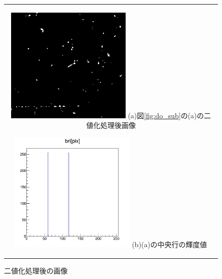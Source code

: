 \documentclass[12pt,a4paper]{jarticle}
\begin{document}
\begin{figure}[htbp]
    \begin{center}
      \begin{tabular}{c}
        \begin{minipage}{0.5\hsize}
          \begin{center}
            \includegraphics[clip, width=60mm]{thre.png}
            \hspace{1.6cm} (a)図\ref{fig:do_sub}の(a)の二値化処理後画像
          \end{center}
        \end{minipage}

        \begin{minipage}{0.5\hsize}
          \begin{center}
            \includegraphics[clip, width=60mm]{thre_hist.png}
            \hspace{1.6cm} (b)(a)の中央行の輝度値
          \end{center}
        \end{minipage}
    
      \end{tabular}
      \caption{二値化処理後の画像\label{fig:do_thre}}
    \end{center}
\end{figure}
\end{document}
